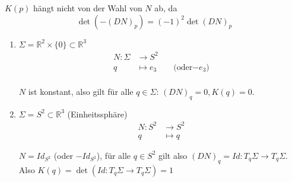 \documentclass[../main.tex]{subfiles}
\begin{document}
\begin{remark}
    $K(p)$ hängt nicht von der Wahl von $N$ ab, da $$\det(-(DN)_{p}) = (-1)^{2} \det(DN)_{p}$$
\end{remark}
\begin{examples}
    \leavevmode
    \begin{enumerate}
        \item 
        \begin{minipage}[t]{0.6\columnwidth}
            $\Sigma = \mathbb{R}^{2} \times \{0\} \subset \mathbb{R}^{3}$
            \begin{align*}
                N : \Sigma & \to S^{2}\\
                q & \mapsto e_{3} \qquad \text{(oder$-e_{3}$)}\\
            \end{align*}
        \end{minipage}
        \begin{minipage}[t]{0.2\columnwidth}
            \begin{figure}[H]
                \centering
                \def\svgwidth{\textwidth}
                
            \end{figure}
        \end{minipage}

        $N$ ist konstant, also gilt für alle $q \in \Sigma$: $(DN)_{q} = 0, K(q) = 0$.
        \newpage

        \item 

        \begin{minipage}[t]{0.6\columnwidth}
            $\Sigma = S^{2} \subset \mathbb{R}^{3}$ (Einheitssphäre)
            \begin{align*}
                N: S^{2} &\to S^{2}\\
                q &\mapsto q
            \end{align*}
        \end{minipage}
        \begin{minipage}[t]{0.2\columnwidth}
            \begin{figure}[H]
                \centering
                \def\svgwidth{\textwidth}
                
            \end{figure}
        \end{minipage}

        $N = Id_{S^{2}}$ (oder $-Id_{S^{2}}$), für alle $q \in S^{2}$ gilt also $(DN)_{q} = Id : T_{q}\Sigma \to T_{q}\Sigma$.
        Also $K(q) = \det (Id: T_{q}\Sigma \to T_{q}\Sigma) = 1$



\end{enumerate}
\end{examples}
\end{document}
